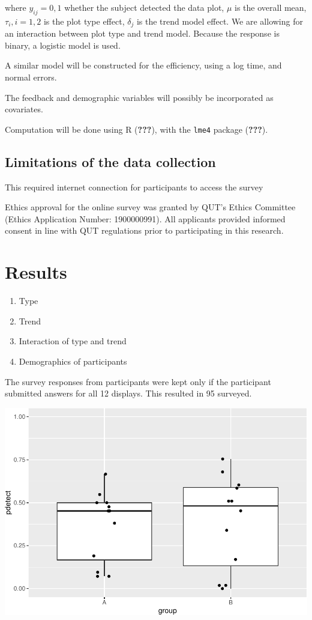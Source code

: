 \documentclass[conference,final,]{IEEEtran}
\makeatletter
\def\maxwidth{\ifdim\Gin@nat@width>\linewidth\linewidth
\else\Gin@nat@width\fi}
\let\Oldincludegraphics\includegraphics
\renewcommand{\includegraphics}[1]{\Oldincludegraphics[width=\maxwidth]{#1}}
\providecommand{\tightlist}{%
  \setlength{\itemsep}{0pt}\setlength{\parskip}{0pt}}
\makeatother
\begin{document}
where \(y_{ij} = 0, 1\) whether the subject detected the data plot,
\(\mu\) is the overall mean, \(\tau_i, i=1,2\) is the plot type effect,
\(\delta_j\) is the trend model effect. We are allowing for an
interaction between plot type and trend model. Because the response is
binary, a logistic model is used.

A similar model will be constructed for the efficiency, using a log
time, and normal errors.

The feedback and demographic variables will possibly be incorporated as
covariates.

Computation will be done using R ({\textbf{???}}), with the
\texttt{lme4} package ({\textbf{???}}).

\hypertarget{limitations-of-the-data-collection}{%
\subsection{Limitations of the data
collection}\label{limitations-of-the-data-collection}}

This required internet connection for participants to access the survey

Ethics approval for the online survey was granted by QUT's Ethics
Committee (Ethics Application Number: 1900000991). All applicants
provided informed consent in line with QUT regulations prior to
participating in this research.

\hypertarget{results}{%
\section{Results}\label{results}}

\begin{enumerate}
\def\labelenumi{\arabic{enumi}.}
\tightlist
\item
  Type\\
\item
  Trend
\item
  Interaction of type and trend
\item
  Demographics of participants
\end{enumerate}

The survey responses from participants were kept only if the participant
submitted answers for all 12 displays. This resulted in 95 surveyed.

\includegraphics{survey_files/figure-latex/unnamed-chunk-2-1.pdf}
\end{document}
